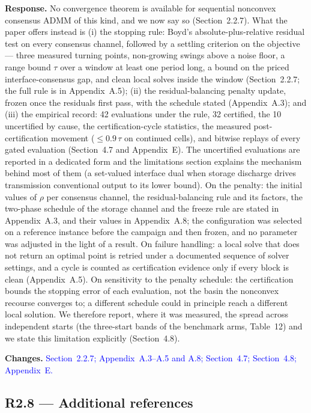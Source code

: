 \documentclass[11pt]{article}
\newcommand{\rresponse}[1]{\noindent\textbf{Response.} #1\par\smallskip}
\newcommand{\rchanges}[1]{\noindent\textbf{Changes.} \textcolor{blue}{#1}\par\medskip}
\begin{document}
\rresponse{No convergence theorem is available for sequential nonconvex consensus ADMM of this kind, and we
now say so (Section~2.2.7). What the paper offers instead is (i) the stopping rule: Boyd's absolute-plus-relative
residual test on every consensus channel, followed by a settling criterion on the objective --- three
measured turning points, non-growing swings above a noise floor, a range bound $\tau$ over a window at
least one period long, a bound on the priced interface-consensus gap, and clean local solves inside the
window (Section~2.2.7; the full rule is in Appendix~A.5); (ii) the residual-balancing penalty update, frozen once the residuals first pass,
with the schedule stated (Appendix~A.3); and (iii) the empirical record: 42 evaluations under the rule, 32
certified, the 10 uncertified by cause, the certification-cycle statistics, the measured
post-certification movement ($\le 0.9\,\tau$ on continued cells), and bitwise replays of every gated
evaluation (Section~4.7 and Appendix~E). The uncertified evaluations are reported in a dedicated form and
the limitations section explains the mechanism behind most of them (a set-valued interface dual when
storage discharge drives transmission conventional output to its lower bound). On the penalty: the
initial values of $\rho$ per consensus channel, the residual-balancing rule and its factors, the two-phase
schedule of the storage channel and the freeze rule are stated in Appendix~A.3, and their values in Appendix~A.8; the configuration was
selected on a reference instance before the campaign and then frozen, and no parameter was adjusted in
the light of a result. On failure handling: a local solve that does not return an optimal point is retried
under a documented sequence of solver settings, and a cycle is counted as certification evidence only if
every block is clean (Appendix~A.5). On sensitivity to the penalty schedule: the certification bounds the
stopping error of each evaluation, not the basin the nonconvex recourse converges to; a different
schedule could in principle reach a different local solution. We therefore report, where it was measured,
the spread across independent starts (the three-start bands of the benchmark arms, Table~12) and we
state this limitation explicitly (Section~4.8).}
\rchanges{Section~2.2.7; Appendix~A.3--A.5 and A.8; Section~4.7; Section~4.8; Appendix~E.}

\subsection*{R2.8 --- Additional references}
\end{document}
